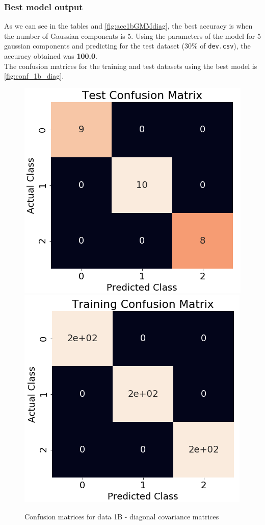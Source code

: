 \documentclass[11pt,a4paper]{article}
\def\tt#1{\texttt{#1}}
\begin{document}
\subsubsection{Best model output}
As we can see in the tables and \autoref{fig:acc1bGMMdiag}, the best accuracy is when the number of Gaussian components is 5. Using the parameters of the model for 5 gaussian components and predicting for the test dataset (30\% of \tt{dev.csv}), the accuracy obtained was \textbf{100.0}.\\
The confusion matrices for the training and test datasets using the best model is \autoref{fig:conf_1b_diag}.
\begin{figure}[H]
    \centering
    \includegraphics[scale=0.45]{images/1B/conf_test1b.png}
    \includegraphics[scale=0.45]{images/1B/conf_train1b.png}
    \caption{Confusion matrices for data 1B - diagonal covariance matrices}
    \label{fig:conf_1b_diag}
\end{figure}
\end{document}
